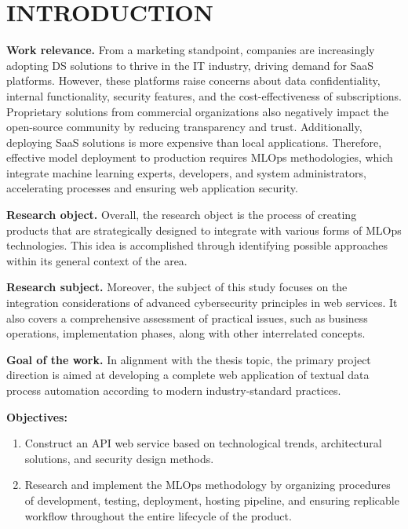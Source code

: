 \chapter*[Introduction]{INTRODUCTION}

\textbf{Work relevance.} 
From a marketing standpoint, companies are increasingly adopting DS solutions to thrive in the IT industry, driving demand for SaaS platforms. However, these platforms raise concerns about data confidentiality, internal functionality, security features, and the cost-effectiveness of subscriptions. Proprietary solutions from commercial organizations also negatively impact the open-source community by reducing transparency and trust. Additionally, deploying SaaS solutions is more expensive than local applications. Therefore, effective model deployment to production requires MLOps methodologies, which integrate machine learning experts, developers, and system administrators, accelerating processes and ensuring web application security.

\textbf{Research object.} Overall, the research object is the process of creating products that are strategically designed to integrate with various forms of MLOps technologies. This idea is accomplished through identifying possible approaches within its general context of the area.

\textbf{Research subject.} Moreover, the subject of this study focuses on the integration considerations of advanced cybersecurity principles in web services. It also covers a comprehensive assessment of practical issues, such as business operations, implementation phases, along with other interrelated concepts.

\textbf{Goal of the work.} In alignment with the thesis topic, the primary project direction is aimed at developing a complete web application of textual data process automation according to modern industry-standard practices.

\textbf{Objectives:}
\begin{enumerate}
    \item Construct an API web service based on technological trends, architectural solutions, and security design methods.
    \item Research and implement the MLOps methodology by organizing procedures of development, testing, deployment, hosting pipeline, and ensuring replicable workflow throughout the entire lifecycle of the product.
\end{enumerate}

